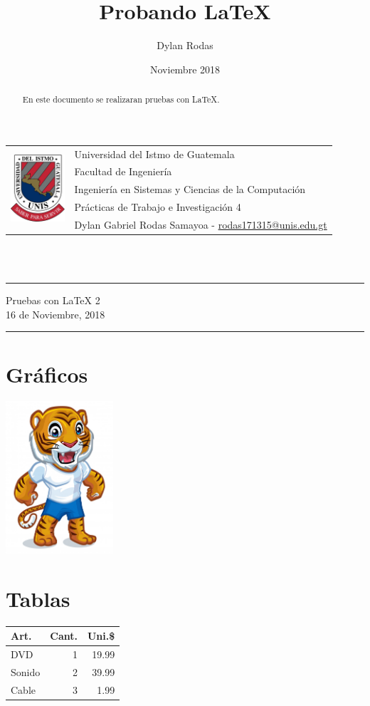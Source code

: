 \documentclass[10pt,a4paper]{article}
\title{Probando LaTeX}
\author{Dylan Rodas}
\date{Noviembre 2018}
\newcommand{\horrule}[1]{\rule{\linewidth}{#1}}
\begin{document}
\begin{tabular}{l l}
\multirow{5}{*}{\includegraphics[width=2cm]{Resources/Logo_UNIS.png}} & Universidad del Istmo de Guatemala \\
& Facultad de Ingeniería \\
& Ingeniería en Sistemas y Ciencias de la Computación \\
& Prácticas de Trabajo e Investigación 4 \\
& Dylan Gabriel Rodas Samayoa - \href{mailto:rodas171315@unis.edu.gt}{rodas171315@unis.edu.gt} \\
\end{tabular}
\\\    
	
\begin{center}
\horrule{1pt}
\huge{Pruebas con LaTeX 2} \\
\large{16 de Noviembre, 2018} \\
\horrule{1pt}
\end{center}

\begin{abstract}
En este documento se realizaran pruebas con LaTeX.
\end{abstract}

\section*{Gr\'aficos}
\includegraphics[width=0.3\textwidth,angle=270]{Resources/Tigre.jpg}

\section*{Tablas}
\begin{tabular}{|l|r|r|} \hline
Art.   & Cant. & Uni.\$ \\\hline
DVD    &   1   & 19.99 \\
Sonido &   2   & 39.99 \\
Cable  &   3   & 1.99 \\\hline
\end{tabular}
\\
\end{document}
